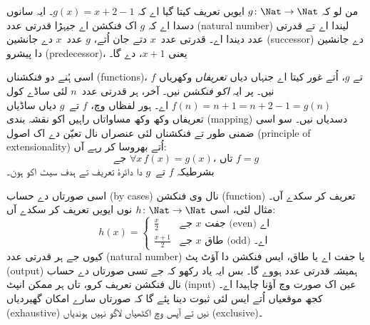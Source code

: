 \documentclass[../../../include/open-logic-section]{subfiles}
\begin{document}
\begin{ex}
من لو کہ $g \colon \Nat \to \Nat$ ایویں تعریف کیتا گیا اے کہ
$g(x) = x+2-1$۔ ایہ سانوں دسدا اے کہ $g$ اک فنکشن اے جیہڑا قدرتی
عدد (natural number) لیندا اے تے قدرتی عدد دیندا اے۔ قدرتی عدد~$x$ دتے جان اُتے، $g$
عدد~$x$ دے جانشین (successor) دے جانشین دا پیشرو (predecessor)، یعنی $x+1$، دے گا۔
\end{ex}

\begin{explain}
اسی ہُنے دو فنکشناں (functions)، $f$ تے $g$، اُتے غور کیتا اے جنہاں دیاں
\emph{تعریفاں} وکھریاں نیں۔ پر ایہ \emph{اکو فنکشن} نیں۔ آخر، ہر
قدرتی عدد~$n$ لئی ساڈے کول $f(n) = n+1 = n+2-1 = g(n)$ اے۔ ہور
لفظاں وچ، $f$ تے~$g$ دیاں ساڈیاں تعریفاں وکھ وکھ مساواتاں راہیں
اکو نقشہ بندی (mapping) دسدیاں نیں۔ سو اسی ضمنی طور تے فنکشناں لئی عنصراں نال
تعیّن دے اک اصول (principle of extensionality) اُتے بھروسا کر رہے آں:
\[
  \text{جے }\forall x\, f(x) = g(x)\text{، تاں }f = g
\]
بشرطیکہ $f$ تے~$g$ دا دائرۂ تعریف تے ہدف سیٹ اکو ہون۔
\end{explain}

\begin{ex}
اسی صورتاں دے حساب (by cases) نال وی فنکشن (function) تعریف کر سکدے آں۔ مثال لئی، اسی
$h \colon \Nat \to \Nat$ نوں ایویں تعریف کر سکدے آں:
\[
h(x) =
\begin{cases}
  \frac{x}{2} & \text{جے $x$ جفت (even) اے} \\
  \frac{x+1}{2} & \text{جے $x$ طاق (odd) اے۔}
\end{cases}
\]
کیوں جے ہر قدرتی عدد (natural number) یا جفت اے یا طاق، ایس فنکشن دا آؤٹ پٹ (output) ہمیشہ
قدرتی عدد ہووے گا۔ بس ایہ یاد رکھو کہ جے تسی صورتاں دے حساب نال
فنکشن تعریف کرو، تاں ہر ممکن انپٹ (input) عین اک صورت وچ آؤنا چاہیدا اے۔
کجھ موقعیاں اُتے ایس لئی ثبوت دینا پئے گا کہ صورتاں سارے امکان
گھیردیاں (exhaustive) نیں تے آپس وچ اکٹھیاں لاگو نہیں ہوندیاں (exclusive)۔
\end{ex}
\end{document}
